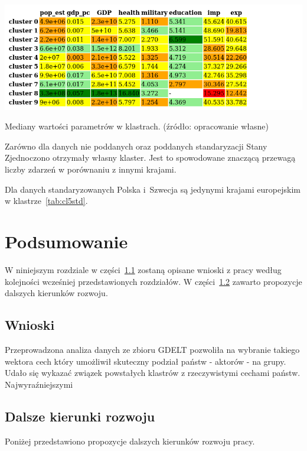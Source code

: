 \documentclass[11pt]{report}
\begin{document}
    \begin{table}[!htp]
        \centering
        \includegraphics[width=\linewidth]{tables/CLUST/desc/cluster_median_summary.png}
        \caption{Mediany wartości parametrów w klastrach. (źródło: opracowanie własne)}
        \label{tab:cl_median_summ}
    \end{table}


    Zarówno dla danych nie poddanych oraz poddanych standaryzacji Stany Zjednoczono otrzymały własny klaster.
    Jest to spowodowane znaczącą przewagą liczby zdarzeń w porównaniu z innymi krajami.

    Dla danych standaryzowanych Polska i~Szwecja są jedynymi krajami europejskim w klastrze~\ref{tab:cl5std}.


    \chapter{Podsumowanie}\label{ch:podsumowanie}
    W niniejszym rozdziale w części~\ref{sec:wnioski} zostaną opisane wnioski z pracy według kolejności wcześniej przedstawionych rozdziałów.
    W części~\ref{sec:dalsze-kierunki-rozwoju} zawarto propozycje dalszych kierunków rozwoju.


    \section{Wnioski}\label{sec:wnioski}
    Przeprowadzona analiza danych ze zbioru GDELT pozwoliła na wybranie takiego wektora cech który umożliwił skuteczny podział państw - aktorów - na grupy.
    Udało się wykazać związek powstałych klastrów z rzeczywistymi cechami państw.
    Najwyraźniejszymi


    \section{Dalsze kierunki rozwoju}\label{sec:dalsze-kierunki-rozwoju}
    Poniżej przedstawiono propozycje dalszych kierunków rozwoju pracy.
\end{document}
